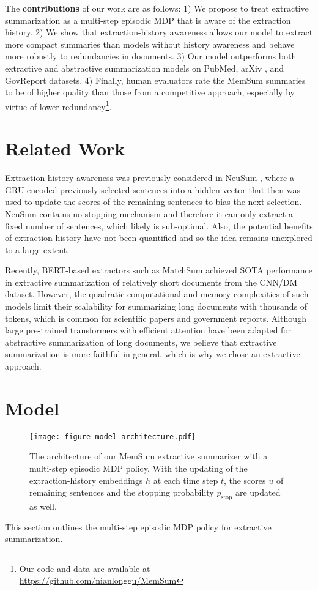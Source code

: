\documentclass[11pt]{article}
\begin{document}
The \textbf{contributions} of our work are as follows: 1) We propose to treat extractive summarization as a multi-step episodic MDP that is aware of the extraction history.
2) We show that extraction-history awareness allows our model to extract more compact summaries than models without history awareness and behave more robustly to redundancies in documents. 3) Our model outperforms both extractive and abstractive summarization models on PubMed, arXiv \cite{cohan2018discourse}, and GovReport \cite{huang2021efficient} datasets. 4) Finally, human evaluators rate the MemSum summaries to be of higher quality than those from a competitive approach, especially by virtue of lower redundancy\footnote{Our code and data are available at \url{https://github.com/nianlonggu/MemSum}}.


\section{Related Work}
\label{sec:related_works}

Extraction history awareness was previously considered in NeuSum \cite{zhou-etal-2018-neural-document}, where a GRU encoded previously selected sentences into a hidden vector that then was used to update the scores of the remaining sentences to bias the next selection. NeuSum contains no stopping mechanism and therefore it can only extract a fixed number of sentences, which likely is sub-optimal. Also, the potential benefits of extraction history have not been quantified and so the idea remains unexplored to a large extent.


Recently, BERT-based extractors such as MatchSum \cite{zhong2020extractive} achieved SOTA performance in extractive summarization of relatively short documents from the CNN/DM \cite{hermann2015teaching} dataset. However, the quadratic computational and memory complexities \cite{huang2021efficient} of such models limit their scalability for summarizing long documents with thousands of tokens, which is common for scientific papers and government reports. Although large pre-trained transformers with efficient attention \cite{huang2021efficient} have been adapted for abstractive summarization of long documents, we believe that extractive summarization is more faithful in general, which is why we chose an extractive approach.



\section{Model}
\begin{figure*}
\centering
  \texttt{[image: figure-model-architecture.pdf]}
  \caption{The architecture of our MemSum extractive summarizer with a multi-step episodic MDP policy.  With the updating of the extraction-history embeddings $h$ at each time step $t$,  the scores $u$ of remaining sentences and the stopping probability $p_\text{stop}$ are updated as well.
  }
  \label{fig:model_architecture}
\end{figure*}
This section outlines the multi-step episodic MDP policy for extractive summarization. 
\end{document}
